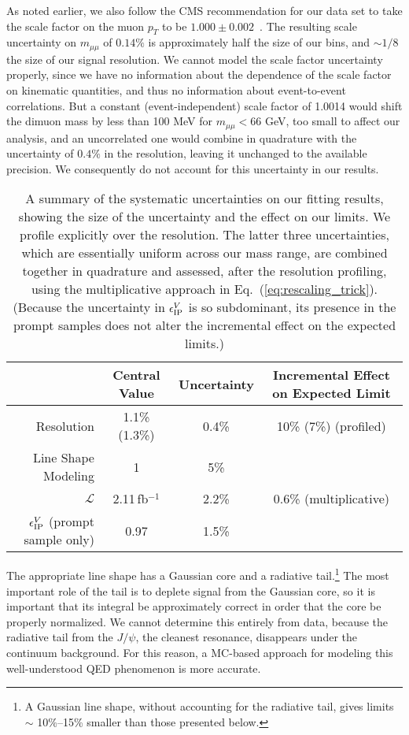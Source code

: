 \documentclass[aps,prd,twocolumn,superscriptaddress,preprintnumbers,nofootinbib,longbibliography,floatfix]{revtex4-1}
\newcommand{\cL}{\mathcal{L}}
\newcommand{\inv}{$^{-1}$}
\DeclareRobustCommand{\Eq}[1]{Eq.~(\ref{#1})}
\begin{document}
As noted earlier, we also follow the CMS recommendation for our data set to take the scale factor on the muon $p_T$ to be $1.000\pm0.002$~\cite{CERNOpenDataMuonRecommendations}.
%
The resulting scale uncertainty on $m_{\mu\mu}$ of $0.14\%$ is approximately half the size of our bins, and $\sim{1}/{8}$ the size of our signal resolution.
%
We cannot model the scale factor uncertainty properly, since we have no information about the dependence of the scale factor on kinematic quantities, and thus no information about event-to-event correlations.
%
But a constant (event-independent) scale factor of 1.0014 would shift the dimuon mass by less than 100 MeV for $m_{\mu\mu}<66$ GeV, too small to affect our analysis, and an uncorrelated one would combine in quadrature with the uncertainty of $0.4\%$ in the resolution, leaving it unchanged to the available precision.
%
We consequently do not account for this uncertainty in our results.

\begin{table*}[t]
\centering
\begin{tabular}{ r @{$\quad$}  c @{$\quad$} c @{$\quad$} c} 
 \hline \hline
 & Central Value & Uncertainty & Incremental Effect on Expected Limit\\
 \hline
 Resolution & 1.1\% (1.3\%)  & 0.4\% &10\% (7\%)  (profiled) \\
\hline
 Line Shape Modeling & 1 & 5\% &  \\
 $\cL$ & 2.11\,fb\inv & 2.2\% & {0.6\%} (multiplicative) \\
$\epsilon^V_{\rm IP}$ (prompt sample only) & 0.97 & 1.5\% & \\
 \hline
 \hline
 \end{tabular}
\caption{A summary of the systematic uncertainties on our fitting results, showing the size of the uncertainty and the effect on our limits.
%
We profile explicitly over the resolution.
%
The latter three uncertainties, which are essentially uniform across our mass range, are combined together in quadrature and assessed, after the resolution profiling, using the multiplicative approach in \Eq{eq:rescaling_trick}.
%
(Because the uncertainty in $\epsilon^V_{\rm IP}$ is so subdominant, its presence in the prompt samples does not alter the incremental effect on the expected limits.)
}
\label{tab:SysUnc}
\end{table*}


The appropriate line shape has a Gaussian core and a radiative tail.\footnote{A Gaussian line shape, without accounting for the radiative tail, gives limits  $\sim$ 10\%--15\% smaller than those presented below.}
%
The most important role of the tail is to deplete signal from the Gaussian core, so it is important that its integral be approximately correct in order that the core be properly normalized.  
%
We cannot determine this entirely from data, because the radiative tail from the $J/\psi$, the cleanest resonance, disappears under the continuum background. 
%
For this reason, a MC-based approach for modeling this well-understood QED phenomenon is more accurate.
\end{document}
